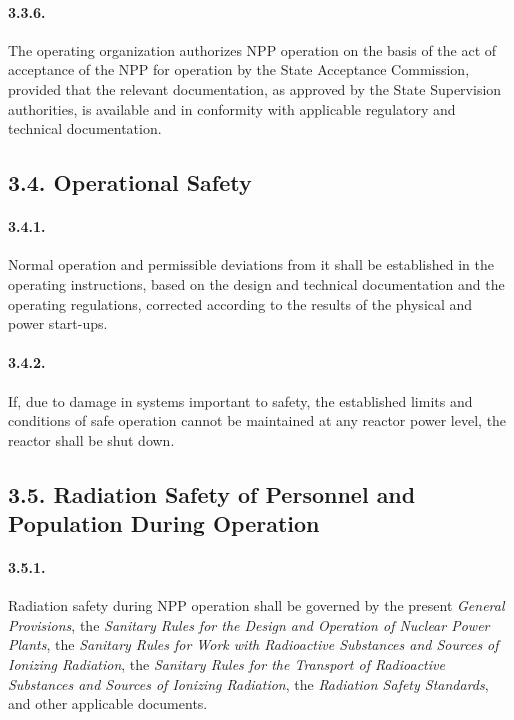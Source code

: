 \documentclass[openright]{bookest}
\begin{document}
\paragraph{3.3.6.}
The operating organization authorizes NPP operation on the basis of the act of acceptance of the NPP for operation by the State Acceptance Commission, provided that the relevant documentation, as approved by the State Supervision authorities, is available and in conformity with applicable regulatory and technical documentation.

\subsection*{3.4. Operational Safety}

\paragraph{3.4.1.}
Normal operation and permissible deviations from it shall be established in the operating instructions, based on the design and technical documentation and the operating regulations, corrected according to the results of the physical and power start-ups.

\paragraph{3.4.2.}
If, due to damage in systems important to safety, the established limits and conditions of safe operation cannot be maintained at any reactor power level, the reactor shall be shut down.

\subsection*{3.5. Radiation Safety of Personnel and Population During Operation}

\paragraph{3.5.1.}
Radiation safety during NPP operation shall be governed by the present \textit{General Provisions}, the \textit{Sanitary Rules for the Design and Operation of Nuclear Power Plants}, the \textit{Sanitary Rules for Work with Radioactive Substances and Sources of Ionizing Radiation}, the \textit{Sanitary Rules for the Transport of Radioactive Substances and Sources of Ionizing Radiation}, the \textit{Radiation Safety Standards}, and other applicable documents.
\end{document}
